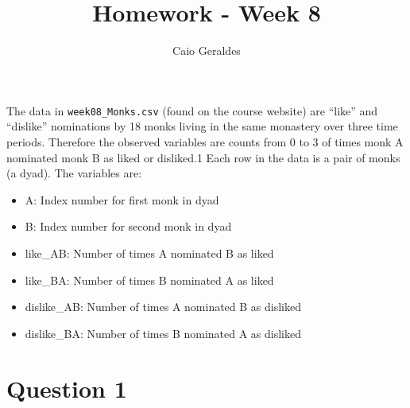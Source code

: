 \documentclass[
]{article}
\title{Homework - Week 8}
\author{Caio Geraldes}
\date{}
\newenvironment{Shaded}{\begin{snugshade}}{\end{snugshade}}
\newcommand{\AttributeTok}[1]{\textcolor[rgb]{0.77,0.63,0.00}{#1}}
\newcommand{\ConstantTok}[1]{\textcolor[rgb]{0.00,0.00,0.00}{#1}}
\newcommand{\FunctionTok}[1]{\textcolor[rgb]{0.00,0.00,0.00}{#1}}
\newcommand{\NormalTok}[1]{#1}
\newcommand{\OtherTok}[1]{\textcolor[rgb]{0.56,0.35,0.01}{#1}}
\newcommand{\SpecialCharTok}[1]{\textcolor[rgb]{0.00,0.00,0.00}{#1}}
\newcommand{\StringTok}[1]{\textcolor[rgb]{0.31,0.60,0.02}{#1}}
\providecommand{\tightlist}{%
  \setlength{\itemsep}{0pt}\setlength{\parskip}{0pt}}
\begin{document}
\maketitle

The data in \texttt{week08\_Monks.csv} (found on the course website) are
``like'' and ``dislike'' nominations by 18 monks living in the same
monastery over three time periods. Therefore the observed variables are
counts from 0 to 3 of times monk A nominated monk B as liked or
disliked.1 Each row in the data is a pair of monks (a dyad). The
variables are:

\begin{itemize}
\tightlist
\item
  A: Index number for first monk in dyad
\item
  B: Index number for second monk in dyad
\item
  like\_AB: Number of times A nominated B as liked
\item
  like\_BA: Number of times B nominated A as liked
\item
  dislike\_AB: Number of times A nominated B as disliked
\item
  dislike\_BA: Number of times B nominated A as disliked
\end{itemize}

\begin{Shaded}
\end{Shaded}

\hypertarget{question-1}{%
\section{Question 1}\label{question-1}}
\end{document}

